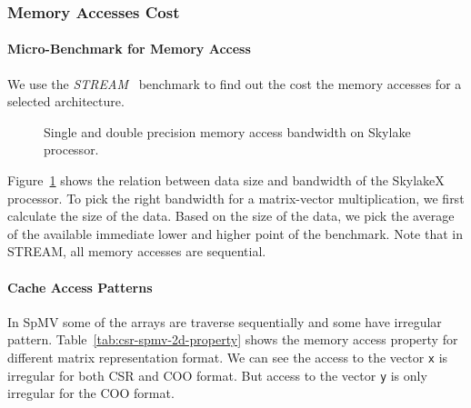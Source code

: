 \documentclass[sigconf,review,anonymous]{acmart}
\begin{document}
\subsubsection{Memory Accesses Cost}

\paragraph{Micro-Benchmark for Memory Access}
We use the \textit{STREAM}~\cite{mccalpin1995stream} benchmark to find
out the cost the memory accesses for a selected architecture.

\begin{figure}[hbt!]
	\centering
	\caption{Single and double precision memory access bandwidth on Skylake processor.}
	\label{fig:stream-copy-bandwidth}
\end{figure}

Figure~\ref{fig:stream-copy-bandwidth} shows the relation between data
size and bandwidth of the SkylakeX processor. To pick the right
bandwidth for a matrix-vector multiplication, we first calculate the
size of the data. Based on the size of the data, we pick the average
of the available immediate lower and higher point of the
benchmark. Note that in STREAM, all memory accesses are sequential.
 
\paragraph{Cache Access Patterns}
In SpMV some of the arrays are traverse sequentially and some have irregular
pattern. Table~\ref{tab:csr-spmv-2d-property} shows the memory access
property for different matrix representation format. We can see the
access to the vector \texttt{x} is irregular for both CSR and COO
format. But access to the vector \texttt{y} is only irregular for the
COO format.
\end{document}
